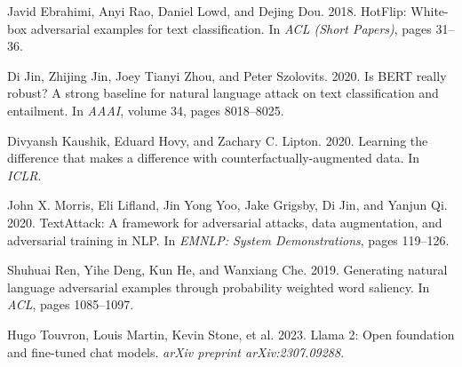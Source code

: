 \documentclass[11pt]{article}
\begin{document}
\begin{thebibliography}{}

Javid Ebrahimi, Anyi Rao, Daniel Lowd, and Dejing Dou. 2018.
\newblock HotFlip: White-box adversarial examples for text classification.
\newblock In \emph{ACL (Short Papers)}, pages 31--36.

Di Jin, Zhijing Jin, Joey Tianyi Zhou, and Peter Szolovits. 2020.
\newblock Is BERT really robust? A strong baseline for natural language attack
  on text classification and entailment.
\newblock In \emph{AAAI}, volume 34, pages 8018--8025.

Divyansh Kaushik, Eduard Hovy, and Zachary C. Lipton. 2020.
\newblock Learning the difference that makes a difference with
  counterfactually-augmented data.
\newblock In \emph{ICLR}.

John X. Morris, Eli Lifland, Jin Yong Yoo, Jake Grigsby, Di Jin, and Yanjun Qi.
  2020.
\newblock TextAttack: A framework for adversarial attacks, data augmentation,
  and adversarial training in NLP.
\newblock In \emph{EMNLP: System Demonstrations}, pages 119--126.

Shuhuai Ren, Yihe Deng, Kun He, and Wanxiang Che. 2019.
\newblock Generating natural language adversarial examples through probability
  weighted word saliency.
\newblock In \emph{ACL}, pages 1085--1097.

Hugo Touvron, Louis Martin, Kevin Stone, et al. 2023.
\newblock Llama 2: Open foundation and fine-tuned chat models.
\newblock \emph{arXiv preprint arXiv:2307.09288}.

\end{thebibliography}
\end{document}
